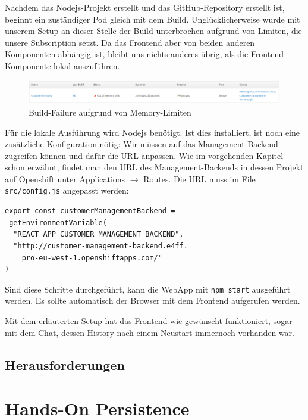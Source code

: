 \documentclass[12pt,a4paper]{article}
\begin{document}
Nachdem das Nodejs-Projekt erstellt und das GitHub-Repository erstellt ist, beginnt ein zuständiger Pod gleich mit dem Build. Unglücklicherweise wurde mit unserem Setup an dieser Stelle der Build unterbrochen aufgrund von Limiten, die unsere Subscription setzt. Da das Frontend aber von beiden anderen Komponenten abhängig ist, bleibt uns nichts anderes übrig, als die Frontend-Komponente lokal auszuführen. 

\begin{figure}[h]
	\centering
	\includegraphics[width=1\linewidth]{img/os-frontend-build-fail}
	\caption{Build-Failure aufgrund von Memory-Limiten}
	\label{fig:os-frontend-build-fail}
\end{figure}

Für die lokale Ausführung wird Nodejs benötigt. Ist dies installiert, ist noch eine zusätzliche Konfiguration nötig: Wir müssen auf das Management-Backend zugreifen können und dafür die URL anpassen. Wie im vorgehenden Kapitel schon erwähnt, findet man den URL des Management-Backends in dessen Projekt auf Openshift unter Applications $\rightarrow$ Routes. Die URL muss im File \texttt{src/config.js} angepasst werden:
\begin{lstlisting}[showstringspaces=false]
export const customerManagementBackend =
 getEnvironmentVariable(
  "REACT_APP_CUSTOMER_MANAGEMENT_BACKEND",
  "http://customer-management-backend.e4ff.
    pro-eu-west-1.openshiftapps.com/"
)
\end{lstlisting}
Sind diese Schritte durchgeführt, kann die WebApp mit \texttt{npm start} ausgeführt werden. Es sollte automatisch der Browser mit dem Frontend aufgerufen werden. 

Mit dem erläuterten Setup hat das Frontend wie gewünscht funktioniert, sogar mit dem Chat, dessen History nach einem Neustart immernoch vorhanden war. 

\subsection{Herausforderungen}
\section{Hands-On Persistence}
\end{document}
